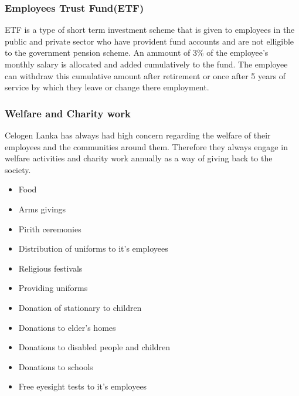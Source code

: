 \documentclass[a4paper,12pt]{article}
\begin{document}
				\subsubsection*{Employees Trust Fund(ETF)}
				
				ETF is a type of short term investment scheme that is given to employees in the public and private sector who have provident fund accounts and are not elligible to the government pension scheme.
			An ammount of 3\% of the employee's monthly salary is allocated and added cumulatively to the fund.
			The employee can withdraw this cumulative amount after retirement or once after 5 years of service by which they leave or change there employment.
			    
			\subsubsection{Welfare and Charity work}
			
			Celogen Lanka has always had high concern regarding the welfare of their employees and the communities around them.
			Therefore they always engage in welfare activities and charity work annually as a way of giving back to the society.
			
			\begin{itemize}
				\item Food
				\item Arms givings
				\item Pirith ceremonies
				\item Distribution of uniforms to it's employees
				\item Religious festivals
				\item Providing uniforms
				\item Donation of stationary to children
				\item Donations to elder's homes
				\item Donations to disabled people and children
				\item Donations to schools
				\item Free eyesight tests to it's employees			
			\end{itemize}			 
			
			\newpage
\end{document}
